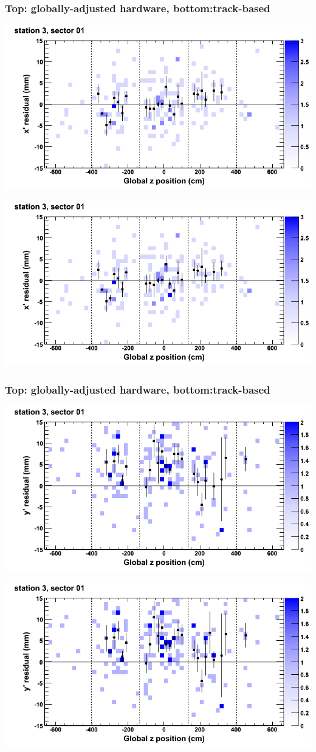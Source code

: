 \documentclass[compress]{beamer}
\begin{document}
\begin{frame}
\frametitle{Top: globally-adjusted hardware, bottom:track-based}
\includegraphics[width=0.7\linewidth]{NOV4_mapplots_HW/DTvsz_st3sec01_x.png}

\includegraphics[width=0.7\linewidth]{NOV4_mapplots/DTvsz_st3sec01_x.png}
\end{frame}

\begin{frame}
\frametitle{Top: globally-adjusted hardware, bottom:track-based}
\includegraphics[width=0.7\linewidth]{NOV4_mapplots_HW/DTvsz_st3sec01_y.png}

\includegraphics[width=0.7\linewidth]{NOV4_mapplots/DTvsz_st3sec01_y.png}
\end{frame}
\end{document}
